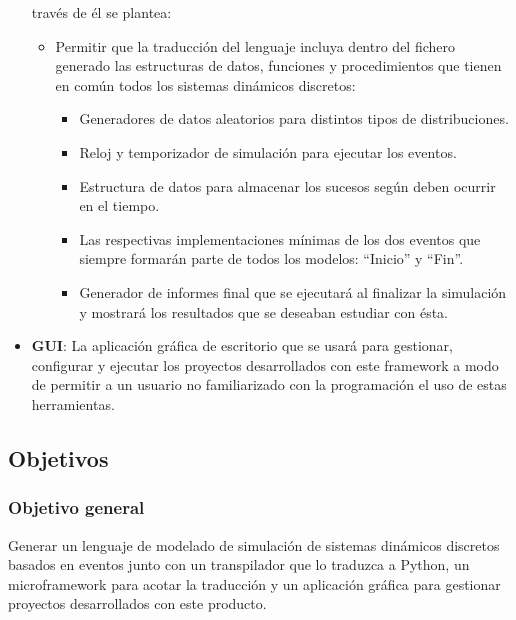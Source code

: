 \begin{itemize}
    través de él se plantea:
    \begin{itemize}
        \item Permitir que la traducción del lenguaje incluya dentro del fichero
        generado las estructuras de datos, funciones y procedimientos que tienen
        en común todos los sistemas dinámicos discretos: 
        \begin{itemize}
            \item Generadores de datos aleatorios para distintos tipos de
            distribuciones.
            \item Reloj y temporizador de simulación para ejecutar los eventos.
            \item Estructura de datos para almacenar los sucesos según deben
            ocurrir en el tiempo.
            \item Las respectivas implementaciones mínimas de los dos eventos
            que siempre formarán parte de todos los modelos: “Inicio” y “Fin”.
            \item Generador de informes final que se ejecutará al finalizar la
            simulación y mostrará los resultados que se deseaban estudiar con
            ésta.
        \end{itemize}
    \end{itemize}
    \item \textbf{GUI}: La aplicación gráfica de escritorio que se usará para
    gestionar, configurar y ejecutar los proyectos desarrollados con este
    framework a modo de permitir a un usuario no familiarizado con la
    programación el uso de estas herramientas.
\end{itemize}




\subsection{Objetivos}\label{subsec:objetivos}

\subsubsection{Objetivo general}
Generar un lenguaje de modelado de simulación de sistemas dinámicos discretos
basados en eventos junto con un transpilador que lo traduzca a Python, un
microframework para acotar la traducción y un aplicación gráfica para gestionar
proyectos desarrollados con este producto. 

